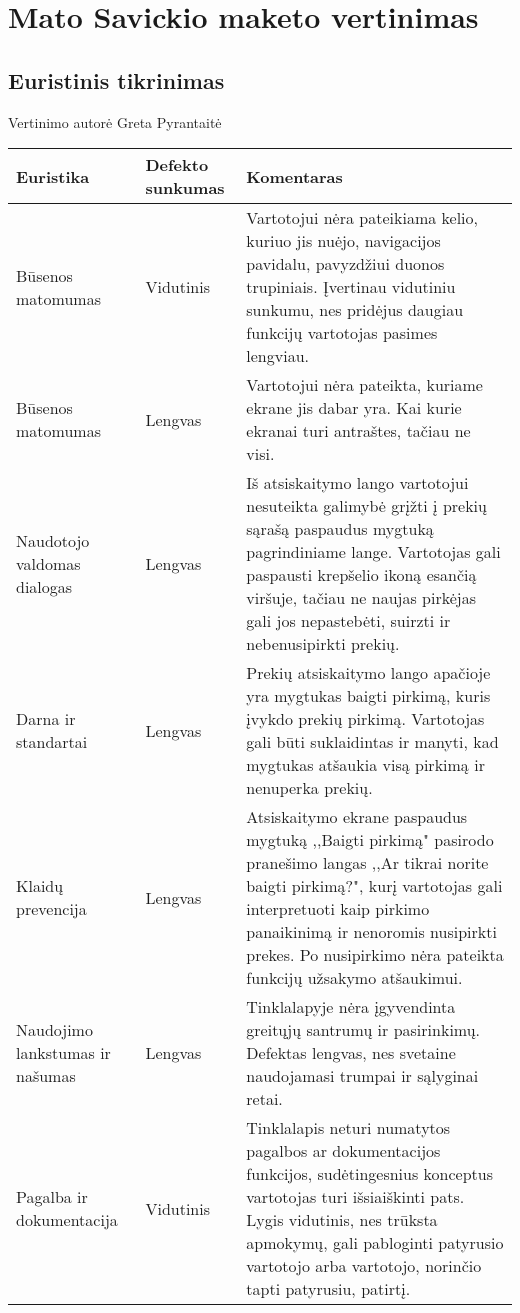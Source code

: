 \documentclass[oneside]{VUMIFPSkursinis}
\begin{document}
\section{Mato Savickio maketo vertinimas}
	\subsection{Euristinis tikrinimas}
Vertinimo autorė Greta Pyrantaitė
\begin{center}
    \begin{tabular}{ |p{3cm}| p{3cm} | p{11cm} | }
    \hline
    	Euristika &Defekto sunkumas & Komentaras \\ \hline 
	Būsenos matomumas & Vidutinis & Vartotojui nėra pateikiama kelio, kuriuo jis nuėjo, navigacijos pavidalu, pavyzdžiui duonos trupiniais. Įvertinau vidutiniu sunkumu, nes pridėjus daugiau funkcijų vartotojas pasimes lengviau. \\ \hline
	Būsenos matomumas & Lengvas & Vartotojui nėra pateikta, kuriame ekrane jis dabar yra. Kai kurie ekranai turi antraštes, tačiau ne visi. \\ \hline
	Naudotojo valdomas dialogas & Lengvas & Iš atsiskaitymo lango vartotojui nesuteikta galimybė grįžti į prekių sąrašą paspaudus mygtuką pagrindiniame lange. Vartotojas gali paspausti krepšelio ikoną esančią viršuje, tačiau ne naujas pirkėjas gali jos nepastebėti, suirzti ir nebenusipirkti prekių. \\ \hline
	Darna ir standartai & Lengvas & Prekių atsiskaitymo lango apačioje yra mygtukas baigti pirkimą, kuris įvykdo prekių pirkimą. Vartotojas gali būti suklaidintas ir manyti, kad mygtukas atšaukia visą pirkimą ir nenuperka prekių. \\ \hline 
	Klaidų prevencija & Lengvas & Atsiskaitymo ekrane paspaudus mygtuką ,,Baigti pirkimą" pasirodo pranešimo langas ,,Ar tikrai norite baigti pirkimą?", kurį vartotojas gali interpretuoti kaip pirkimo panaikinimą ir nenoromis nusipirkti prekes. Po nusipirkimo nėra pateikta funkcijų užsakymo atšaukimui. \\ \hline 
	Naudojimo lankstumas ir našumas & Lengvas & Tinklalapyje nėra įgyvendinta greitųjų santrumų ir pasirinkimų. Defektas lengvas, nes svetaine naudojamasi trumpai ir sąlyginai retai. \\ \hline
	Pagalba ir dokumentacija & Vidutinis & Tinklalapis neturi numatytos pagalbos ar dokumentacijos funkcijos, sudėtingesnius konceptus vartotojas turi išsiaiškinti pats. Lygis vidutinis, nes trūksta apmokymų, gali pabloginti patyrusio vartotojo arba vartotojo, norinčio tapti patyrusiu, patirtį. \\ \hline
	
   \hline
    \end{tabular}
\end{center}
\pagebreak
\end{document}
